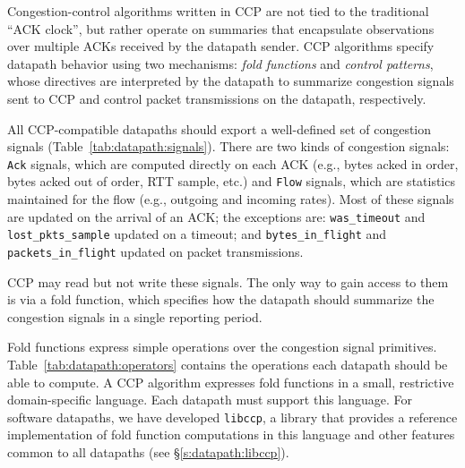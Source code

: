  
Congestion-control algorithms written in CCP are not tied to the traditional ``ACK clock'', but rather operate on summaries that encapsulate observations over multiple ACKs received by the datapath sender.
CCP algorithms specify datapath behavior using two mechanisms: {\em fold functions} and {\em control patterns}, whose directives are interpreted by the datapath to summarize congestion signals sent to CCP and control packet transmissions on the datapath, respectively. 
 
 All CCP-compatible datapaths should export a well-defined set of congestion signals (Table~\ref{tab:datapath:signals}). There are two kinds of congestion signals: \texttt{Ack} signals, which are computed directly on each ACK (e.g., bytes acked in order, bytes acked out of order, RTT sample, etc.) and \texttt{Flow} signals, which are statistics maintained for the flow (e.g., outgoing and incoming rates). Most of these signals are updated on the arrival of an ACK; the exceptions are: \texttt{was\_timeout} and \texttt{lost\_pkts\_sample} updated on a timeout; and \texttt{bytes\_in\_flight} and \texttt{packets\_in\_flight} updated on packet transmissions.
 

CCP may read but not write these signals. The only way to gain access to them is via a fold function, which specifies how the datapath should summarize the congestion signals in a single reporting period. 
 
 
%

Fold functions express simple operations over the congestion signal primitives. Table~\ref{tab:datapath:operators} contains the operations each datapath should be able to compute. A CCP algorithm expresses fold functions in a small, restrictive domain-specific language. Each datapath must support this language. For software datapaths, we have developed \texttt{libccp}, a library that provides a reference implementation of fold function computations in this language and other features common to all datapaths (see \S\ref{s:datapath:libccp}). 
 
